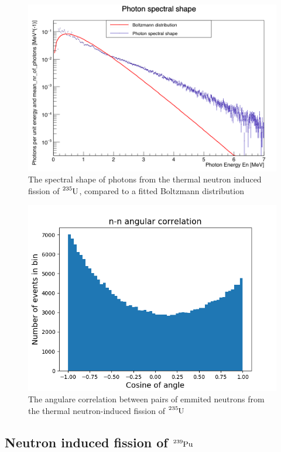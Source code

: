 \documentclass[]{article}
\begin{document}
\begin{figure} [H]
	\centering
	\includegraphics[scale=0.34]{U235_ph_spectral_shape.png}
	\caption{The spectral shape of photons from the thermal neutron induced fission of $\ce{^{235}U}$, compared to a fitted Boltzmann distribution}
	\label{fig:U235_ph_spectral_shape}
\end{figure}

\begin{figure} [H]
	\centering
	\includegraphics[scale=0.65]{U235_n_n_ang_corr.png}
	\caption{The angulare correlation between pairs of emmited neutrons from the thermal neutron-induced fission of $\ce{^{235}U}$}
	\label{fig:U235_n_n_ang_corr}
\end{figure}


\subsection{Neutron induced fission of $\ce{^{239}Pu}$}
\end{document}
